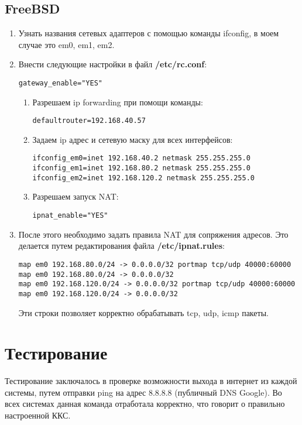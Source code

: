 \documentclass[14pt,a4paper,report]{report}
\begin{document}
\subsection{FreeBSD}
\begin{enumerate}
\item Узнать названия сетевых адаптеров с помощью команды ifconfig, в моем случае это em0, em1, em2.
\item Внести следующие настройки в файл \textbf{/etc/rc.conf}:
\begin{lstlisting}[language={}]
gateway_enable="YES"
\end{lstlisting}
\begin{enumerate}
\item Разрешаем ip forwarding при помощи команды:
\begin{lstlisting}[language={}]
defaultrouter=192.168.40.57
\end{lstlisting}
\item Задаем ip адрес и сетевую маску для всех интерфейсов:
\begin{lstlisting}[language={}]
ifconfig_em0=inet 192.168.40.2 netmask 255.255.255.0
ifconfig_em1=inet 192.168.80.2 netmask 255.255.255.0
ifconfig_em2=inet 192.168.120.2 netmask 255.255.255.0
\end{lstlisting}
\item Разрешаем запуск NAT:
\begin{lstlisting}[language={}]
ipnat_enable="YES"
\end{lstlisting}
\end{enumerate}
\item После этого необходимо задать правила NAT для сопряжения адресов. Это делается путем редактирования файла \textbf{/etc/ipnat.rules}:
\begin{lstlisting}[language={}]
map em0 192.168.80.0/24 -> 0.0.0.0/32 portmap tcp/udp 40000:60000 
map em0 192.168.80.0/24 -> 0.0.0.0/32 
map em0 192.168.120.0/24 -> 0.0.0.0/32 portmap tcp/udp 40000:60000
map em0 192.168.120.0/24 -> 0.0.0.0/32
\end{lstlisting}
Эти строки позволяет корректно обрабатывать tcp, udp, icmp пакеты.
\end{enumerate}

\section{Тестирование}
Тестирование заключалось в проверке возможности выхода в интернет из каждой системы, путем отправки ping на адрес 8.8.8.8 (публичный DNS Google). Во всех системах данная команда отработала корректно, что говорит о правильно настроенной ККС.
\end{document}
